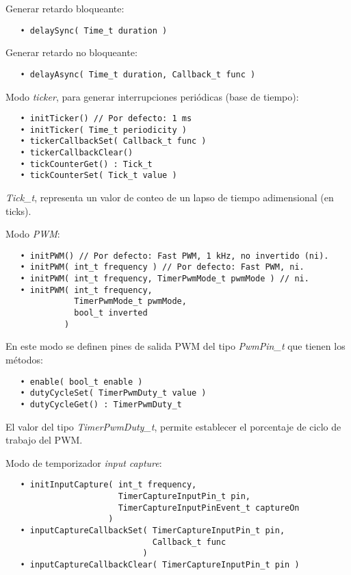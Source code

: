 
Generar retardo bloqueante:

\begin{verbatim}
   • delaySync( Time_t duration )
\end{verbatim}

Generar retardo no bloqueante:

\begin{verbatim}
   • delayAsync( Time_t duration, Callback_t func )
\end{verbatim}

Modo \emph{ticker}, para generar interrupciones periódicas (base de tiempo):

\begin{verbatim}
   • initTicker() // Por defecto: 1 ms
   • initTicker( Time_t periodicity )
   • tickerCallbackSet( Callback_t func )
   • tickerCallbackClear()
   • tickCounterGet() : Tick_t
   • tickCounterSet( Tick_t value )
\end{verbatim}

\emph{Tick\_t}, representa un valor de conteo de un lapso de tiempo adimensional (en ticks).

Modo \emph{PWM}:

\begin{verbatim}
   • initPWM() // Por defecto: Fast PWM, 1 kHz, no invertido (ni).
   • initPWM( int_t frequency ) // Por defecto: Fast PWM, ni.
   • initPWM( int_t frequency, TimerPwmMode_t pwmMode ) // ni.
   • initPWM( int_t frequency, 
              TimerPwmMode_t pwmMode, 
              bool_t inverted 
            )
\end{verbatim}

En este modo se definen pines de salida PWM del tipo \emph{PwmPin\_t} que tienen los métodos:

\begin{verbatim}
   • enable( bool_t enable )
   • dutyCycleSet( TimerPwmDuty_t value )
   • dutyCycleGet() : TimerPwmDuty_t
\end{verbatim}

El valor del tipo \emph{TimerPwmDuty\_t}, permite establecer el porcentaje de ciclo de trabajo del PWM.

Modo de temporizador \emph{input capture}:

\begin{verbatim}
   • initInputCapture( int_t frequency, 
                       TimerCaptureInputPin_t pin,
                       TimerCaptureInputPinEvent_t captureOn
                     )
   • inputCaptureCallbackSet( TimerCaptureInputPin_t pin,
                              Callback_t func 
                            )
   • inputCaptureCallbackClear( TimerCaptureInputPin_t pin )
\end{verbatim}

